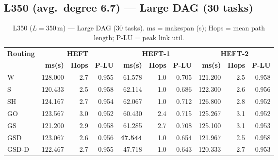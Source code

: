 \documentclass[11pt]{article}
\newcommand{\win}[1]{\textcolor{green!50!black}{\textbf{#1}}}
\newcommand{\bad}[1]{\textcolor{red!70!black}{#1}}
\begin{document}
\subsection{L350 (avg.\ degree 6.7) --- Large DAG (30 tasks)}
\begin{table}[H]
\centering\small
\begin{tabular}{l r r r r r r r r r}
\toprule
\textbf{Routing} & \multicolumn{3}{c}{\textbf{HEFT}} & \multicolumn{3}{c}{\textbf{HEFT-1}} & \multicolumn{3}{c}{\textbf{HEFT-2}} \\
\cmidrule(lr){2-4}\cmidrule(lr){5-7}\cmidrule(lr){8-10}
& \textbf{ms(s)} & \textbf{Hops} & \textbf{P-LU} & \textbf{ms(s)} & \textbf{Hops} & \textbf{P-LU} & \textbf{ms(s)} & \textbf{Hops} & \textbf{P-LU} \\
\midrule
  W & \bad{128.000} & 2.7 & 0.955 & 61.578 & 1.0 & 0.705 & 121.200 & 2.5 & 0.958 \\
  S & 120.433 & 2.5 & 0.958 & \bad{62.114} & 1.0 & 0.686 & 122.300 & 2.6 & 0.956 \\
  SH & 124.167 & 2.7 & 0.954 & \bad{62.067} & 1.0 & 0.712 & \bad{126.800} & 2.8 & 0.952 \\
  GO & 123.567 & 3.0 & 0.952 & 60.430 & 2.4 & 0.715 & 125.267 & 3.1 & 0.952 \\
  GS & 121.200 & 2.9 & 0.958 & 61.285 & 2.7 & 0.708 & 125.100 & 3.1 & 0.953 \\
  GSD & 123.067 & 2.6 & 0.956 & \win{47.544} & 1.0 & 0.654 & 121.967 & 2.5 & 0.958 \\
  GSD-D & 122.467 & 2.7 & 0.955 & 47.718 & 1.0 & 0.643 & 120.333 & 2.7 & 0.953 \\
\bottomrule
\end{tabular}
\caption{L350 ($L=350$\,m) --- Large DAG (30 tasks). ms = makespan (s); Hops = mean path length; P-LU = peak link util.}
\end{table}
\end{document}
